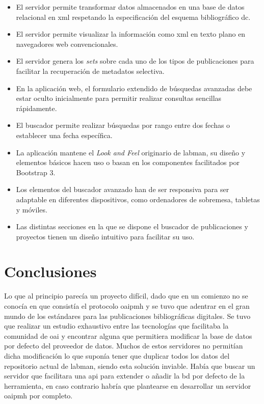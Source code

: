\begin{itemize}
	\item El servidor permite transformar datos almacenados en una base de datos relacional en \acrshort{xml} respetando la especificación del esquema bibliográfico \acrshort{dc}.
	\item El servidor permite visualizar la información como \acrshort{xml} en texto plano en navegadores web convencionales.
	\item El servidor genera los \textit{sets} sobre cada uno de los tipos de publicaciones para facilitar la recuperación de metadatos selectiva.
	\item En la aplicación web, el formulario extendido de búsquedas avanzadas debe estar oculto inicialmente para permitir realizar consultas sencillas rápidamente.
	\item El buscador permite realizar búsquedas por rango entre dos fechas o establecer una fecha específica.
	\item La aplicación mantene el \textit{Look and Feel} originario de \acrshort{labman}, su diseño y elementos básicos hacen uso o basan en los componentes facilitados por Bootstrap 3.
	\item Los elementos del buscador avanzado han de ser responsiva para ser adaptable en diferentes dispositivos, como ordenadores de sobremesa, tabletas y móviles.
	\item Las distintas secciones en la que se dispone el buscador de publicaciones y proyectos tienen un diseño intuitivo para facilitar su uso. 
\end{itemize}

\section{Conclusiones}

Lo que al principio parecía un proyecto difícil, dado que en un comienzo no se conocía en que consistía el protocolo \acrshort{oaipmh} y se tuvo que adentrar en el gran mundo de los estándares para las publicaciones bibliográficas digitales. Se tuvo que realizar un estudio exhaustivo entre las tecnologías que facilitaba la comunidad de \acrshort{oai} y encontrar alguna que permitiera modificar la base de datos por defecto del proveedor de datos. Muchos de estos servidores no permitían dicha modificación lo que suponía tener que duplicar todos los datos del repositorio actual de \acrshort{labman}, siendo esta solución inviable. Había que buscar un servidor que facilitara una \acrshort{api} para extender o añadir la \acrshort{bd} por defecto de la herramienta, en caso contrario habría que plantearse en desarrollar un servidor \acrshort{oaipmh} por completo.


